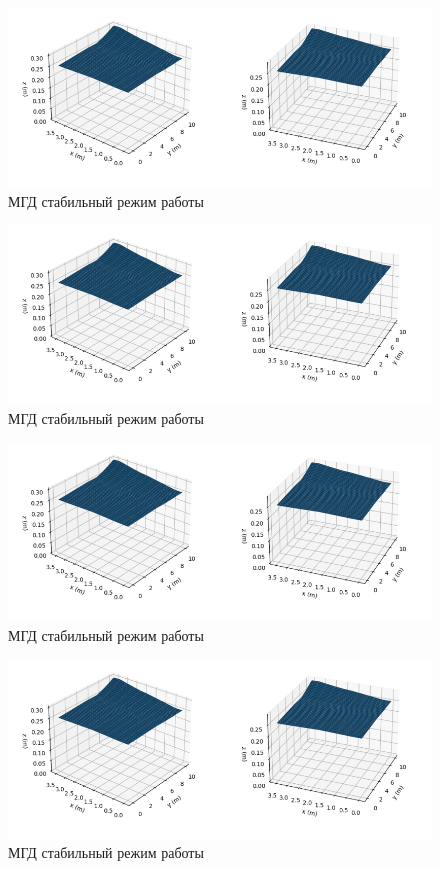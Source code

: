 \documentclass{article}
\begin{document}
\begin{figure}[H]
\hspace*{-5cm}\includegraphics[scale=0.01]{спокойная.PNG}
\caption{МГД стабильный режим работы}
\end{figure}
\begin{figure}[H]
\hspace*{-5cm}\includegraphics[scale=0.01]{спокойная.PNG}
\caption{МГД стабильный режим работы}
\end{figure}
\begin{figure}[H]
\hspace*{-5cm}\includegraphics[scale=0.01]{спокойная.PNG}
\caption{МГД стабильный режим работы}
\end{figure}
\begin{figure}[H]
\hspace*{-5cm}\includegraphics[scale=0.01]{спокойная.PNG}
\caption{МГД стабильный режим работы}
\end{figure}
\end{document}
